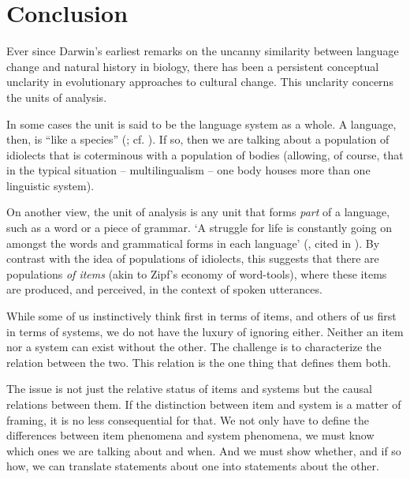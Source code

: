 \chapter{Conclusion}



Ever since Darwin's earliest remarks on the uncanny similarity between 
language change and natural history in biology, there has been a 
persistent conceptual unclarity in evolutionary approaches to cultural 
change. This unclarity concerns the units of analysis. 



In some cases the unit is said to be the language system as a whole. A 
language, then, is ``like a species'' (\citealt[60]{darwin_descent_1871}; cf. \citealt[192--194]{mufwene_ecology_2001}). If so, then we are talking about a population 
of idiolects that is coterminous with a population of bodies (allowing, 
of course, that in the typical situation -- multilingualism -- one body houses 
more than one linguistic system). 



On another view, the unit of analysis is any unit that forms \textit{part} of a language, such as a word or a piece of grammar. \textquoteleft A struggle 
for life is constantly going on amongst the words and grammatical forms 
in each language' (\citealt{muller_darwinism_1870}, cited in \citealt[60]{darwin_descent_1871}). By
contrast with the idea of populations of idiolects, this suggests that 
there are populations \textit{of items }(akin to Zipf's economy of 
word-tools), where these items are produced, and perceived, in the 
context of spoken utterances. 



While some of us instinctively think first in terms of items, and others 
of us first in terms of systems, we do not have the luxury of ignoring either. 
Neither an item nor a system can exist without the other. The challenge 
is to characterize the relation between the two. This relation is the 
one thing that defines them both. 



The issue is not just the relative status of items and systems but the 
causal relations between them. If the distinction 
between item and system is a matter of framing, it is no less 
consequential for that. We not only have to define the differences 
between item phenomena and system phenomena, we must know which ones we 
are talking about and when. And we must show whether, and if so how, we 
can translate statements about one into statements about the other. 

